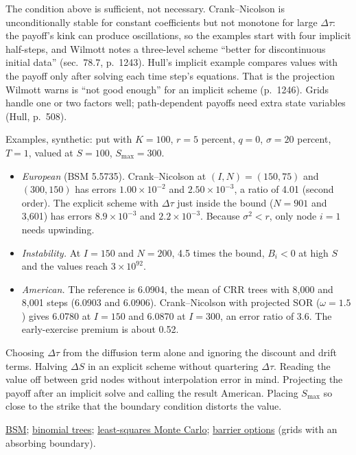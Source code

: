 \begin{qfmethod}
 The condition above is sufficient, not necessary. Crank--Nicolson is unconditionally stable for constant coefficients but not monotone for large $\Delta\tau$: the payoff's kink can produce oscillations, so the examples start with four implicit half-steps, and Wilmott notes a three-level scheme ``better for discontinuous initial data'' (sec.~78.7, p.~1243). Hull's implicit example compares values with the payoff only after solving each time step's equations. That is the projection Wilmott warns is ``not good enough'' for an implicit scheme (p.~1246). Grids handle one or two factors well; path-dependent payoffs need extra state variables (Hull, p.~508).

 Examples, synthetic: put with $K=100$, $r=5$ percent, $q=0$, $\sigma=20$ percent, $T=1$, valued at $S=100$, $S_{\max}=300$.
\begin{itemize}
\item \emph{European} (BSM 5.5735). Crank--Nicolson at $(I,N)=(150,75)$ and $(300,150)$ has errors $1.00\times10^{-2}$ and $2.50\times10^{-3}$, a ratio of 4.01 (second order). The explicit scheme with $\Delta\tau$ just inside the bound ($N=901$ and 3{,}601) has errors $8.9\times10^{-3}$ and $2.2\times10^{-3}$. Because $\sigma^2<r$, only node $i=1$ needs upwinding.
\item \emph{Instability.} At $I=150$ and $N=200$, 4.5 times the bound, $B_i<0$ at high $S$ and the values reach $3\times10^{92}$.
\item \emph{American.} The reference is 6.0904, the mean of CRR trees with 8{,}000 and 8{,}001 steps (6.0903 and 6.0906). Crank--Nicolson with projected SOR ($\omega=1.5$) gives 6.0780 at $I=150$ and 6.0870 at $I=300$, an error ratio of 3.6. The early-exercise premium is about 0.52.
\end{itemize}

 Choosing $\Delta\tau$ from the diffusion term alone and ignoring the discount and drift terms. Halving $\Delta S$ in an explicit scheme without quartering $\Delta\tau$. Reading the value off between grid nodes without interpolation error in mind. Projecting the payoff after an implicit solve and calling the result American. Placing $S_{\max}$ so close to the strike that the boundary condition distorts the value.

 \hyperref[mod:black-scholes-merton]{BSM}; \hyperref[meth:multi-period-binomial-valuation]{binomial trees}; \hyperref[meth:least-squares-monte-carlo]{least-squares Monte Carlo}; \hyperref[meth:barrier-option-valuation]{barrier options} (grids with an absorbing boundary).

\end{qfmethod}

